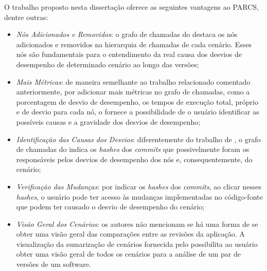 O trabalho proposto nesta dissertação oferece as seguintes vantagens ao PARCS, dentre outras:
\begin{itemize}
   \item \textit{Nós Adicionados e Removidos}: o grafo de chamadas do {\textit{\toolName}} destaca os nós adicionados e removidos na hierarquia de chamadas de cada cenário. Esses nós são fundamentais para o entendimento da real causa dos desvios de desempenho de determinado cenário ao longo das versões;
   \item \textit{Mais Métricas}: de maneira semelhante ao trabalho relacionado comentado anteriormente, por adicionar mais métricas no grafo de chamadas, como a porcentagem de desvio de desempenho, os tempos de execução total, próprio e de desvio para cada nó, o {\textit{\toolName}} fornece a possibilidade de o usuário identificar as possíveis causas e a gravidade dos desvios de desempenho;
   \item \textit{Identificação das Causas dos Desvios}: diferentemente do trabalho de \citeauthor{Mostafa2009}, o grafo de chamadas do {\textit{\toolName}} indica os \textit{hashes} dos \textit{commits} que possivelmente foram os responsáveis pelos desvios de desempenho dos nós e, consequentemente, do cenário;
   \item \textit{Verificação das Mudanças}: por indicar os \textit{hashes} dos \textit{commits}, ao clicar nesses \textit{hashes}, o usuário pode ter acesso às mudanças implementadas no código-fonte que podem ter causado o desvio de desempenho do cenário;
   \item \textit{Visão Geral dos Cenários}: os autores não mencionam se há uma forma de se obter uma visão geral das comparações entre as revisões da aplicação. A visualização da sumarização de cenários fornecida pelo {\textit{\toolName}} possibilita ao usuário obter uma visão geral de todos os cenários para a análise de um par de versões de um software.
\end{itemize}

